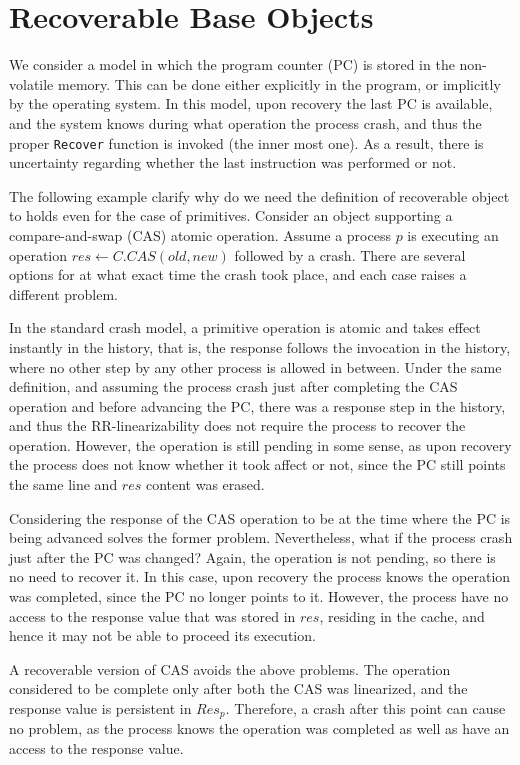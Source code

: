 
\section{Recoverable Base Objects}
\label{section: Recoverable Base Objects}

We consider a model in which the program counter (PC) is stored in the non-volatile memory. This can be done either explicitly in the program, or implicitly by the operating system. In this model, upon recovery the last PC is available, and the system knows during what operation the process crash, and thus the proper \texttt{Recover} function is invoked (the inner most one). As a result, there is uncertainty regarding whether the last instruction was performed or not.

The following example clarify why do we need the definition of recoverable object to holds even for the case of primitives.
Consider an object supporting a compare-and-swap (CAS) atomic operation. Assume a process $p$ is executing an operation $res \leftarrow C.CAS(old,new)$ followed by a crash. There are several options for at what exact time the crash took place, and each case raises a different problem.

In the standard crash model, a primitive operation is atomic and takes effect instantly in the history, that is, the response follows the invocation in the history, where no other step by any other process is allowed in between. Under the same definition, and assuming the process crash just after completing the CAS operation and before advancing the PC, there was a response step in the history, and thus the RR-linearizability does not require the process to recover the operation. However, the operation is still pending in some sense, as upon recovery the process does not know whether it took affect or not, since the PC still points the same line and $res$ content was erased.

Considering the response of the CAS operation to be at the time where the PC is being advanced solves the former problem. Nevertheless, what if the process crash just after the PC was changed? Again, the operation is not pending, so there is no need to recover it. In this case, upon recovery the process knows the operation was completed, since the PC no longer points to it. However, the process have no access to the response value that was stored in $res$, residing in the cache, and hence it may not be able to proceed its execution.

A recoverable version of CAS avoids the above problems. The operation considered to be complete only after both the CAS was linearized, and the response value is persistent in $Res_p$. Therefore, a crash after this point can cause no problem, as the process knows the operation was completed as well as have an access to the response value.

